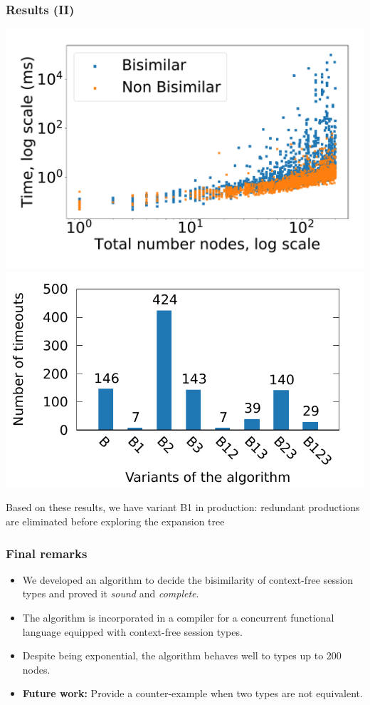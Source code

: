 \documentclass[10pt]{beamer}
\begin{document}
\begin{frame}
  \frametitle{Results (II)}
  \includegraphics[width=.55\textwidth]{img/nodes_time.pdf}%
  \includegraphics[width=.55\textwidth]{img/timeouts.pdf}

  Based on these results, we have variant B1 in production: redundant
  productions are eliminated before exploring the expansion tree
\end{frame}

\begin{frame}
  \frametitle{Final remarks}

  \begin{itemize}
  \item We developed an algorithm to decide the bisimilarity of context-free
    session types and proved it \emph{sound} and \emph{complete}.
  \item The algorithm is incorporated in a compiler for a concurrent functional
    language equipped with context-free session types.
    
  \item Despite being exponential, the algorithm behaves well to types up to 200 nodes.
  \item \textbf{Future work:} Provide a counter-example when two types are not equivalent.
  \end{itemize}
 \end{frame}




 
\end{document}
